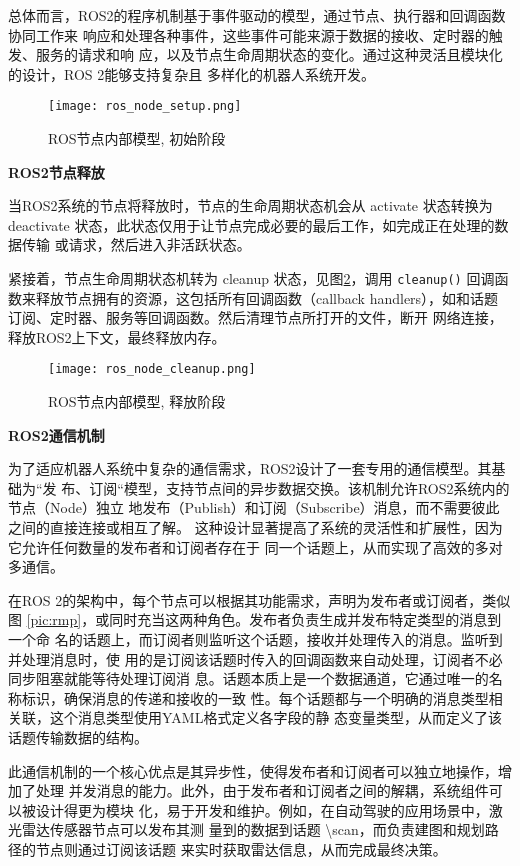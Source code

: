 总体而言，ROS2的程序机制基于事件驱动的模型，通过节点、执行器和回调函数协同工作来
响应和处理各种事件，这些事件可能来源于数据的接收、定时器的触发、服务的请求和响
应，以及节点生命周期状态的变化。通过这种灵活且模块化的设计，ROS 2能够支持复杂且
多样化的机器人系统开发。


\begin{figure}[H]
    \centering
    \texttt{[image: ros\_node\_setup.png]}
    \caption{ROS节点内部模型, 初始阶段}
    \label{pic:rns}
\end{figure}

\textbf{ROS2节点释放}

当ROS2系统的节点将释放时，节点的生命周期状态机会从 activate 状态转换为
deactivate 状态，此状态仅用于让节点完成必要的最后工作，如完成正在处理的数据传输
或请求，然后进入非活跃状态。

紧接着，节点生命周期状态机转为 cleanup 状态，见图\ref{pic:rnc}，调用
\texttt{cleanup()} 回调函数来释放节点拥有的资源，这包括所有回调函数（callback
handlers），如和话题订阅、定时器、服务等回调函数。然后清理节点所打开的文件，断开
网络连接，释放ROS2上下文，最终释放内存。

\begin{figure}[H]
    \centering
    \texttt{[image: ros\_node\_cleanup.png]}
    \caption{ROS节点内部模型, 释放阶段}
    \label{pic:rnc}
\end{figure}

\textbf{ROS2通信机制}

为了适应机器人系统中复杂的通信需求，ROS2设计了一套专用的通信模型。其基础为“发
布、订阅“模型，支持节点间的异步数据交换。该机制允许ROS2系统内的节点（Node）独立
地发布（Publish）和订阅（Subscribe）消息，而不需要彼此之间的直接连接或相互了解。
这种设计显著提高了系统的灵活性和扩展性，因为它允许任何数量的发布者和订阅者存在于
同一个话题上，从而实现了高效的多对多通信。

在ROS 2的架构中，每个节点可以根据其功能需求，声明为发布者或订阅者，类似图
\ref{pic:rmp}，或同时充当这两种角色。发布者负责生成并发布特定类型的消息到一个命
名的话题上，而订阅者则监听这个话题，接收并处理传入的消息。监听到并处理消息时，使
用的是订阅该话题时传入的回调函数来自动处理，订阅者不必同步阻塞就能等待处理订阅消
息。话题本质上是一个数据通道，它通过唯一的名称标识，确保消息的传递和接收的一致
性。每个话题都与一个明确的消息类型相关联，这个消息类型使用YAML格式定义各字段的静
态变量类型，从而定义了该话题传输数据的结构。

此通信机制的一个核心优点是其异步性，使得发布者和订阅者可以独立地操作，增加了处理
并发消息的能力。此外，由于发布者和订阅者之间的解耦，系统组件可以被设计得更为模块
化，易于开发和维护。例如，在自动驾驶的应用场景中，激光雷达传感器节点可以发布其测
量到的数据到话题 \textbackslash scan，而负责建图和规划路径的节点则通过订阅该话题
来实时获取雷达信息，从而完成最终决策。


